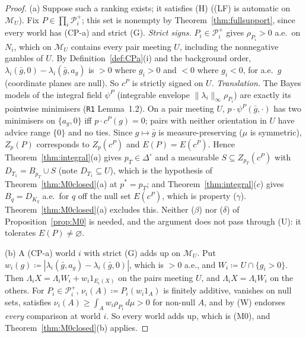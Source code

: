 \documentclass[11pt]{article}
\theoremstyle{definition}
\theoremstyle{remark}
\newcommand{\Di}{\Delta^{\circ}}
\newcommand{\M}{\mathcal M}
\newcommand{\src}[1]{\texttt{#1}}
\begin{document}
\begin{proof}
(a) Suppose such a ranking exists; it satisfies (H) ((LF) is automatic on $\M_U$). Fix $P\in\prod_i\mathcal P^+_i$; this set is nonempty by Theorem~\ref{thm:fullsupport}, since every world has (CP-a) and strict (G). \emph{Strict signs.} $P_i\in\mathcal P^+_i$ gives $\rho_{P_i}>0$ a.e.\ on $N_i$, which on $\M_U$ contains every pair meeting $U$, including the nonnegative gambles of $U$. By Definition~\ref{def:CPa}(i) and the background order, $\lambda_i(\bar g,0)-\lambda_i(\bar g,a_g)$ is $>0$ where $g_i>0$ and $<0$ where $g_i<0$, for a.e.\ $g$ (coordinate planes are null). So $c^P$ is strictly signed on $U$. \emph{Translation.} The Bayes models of the integral field $\psi^P$ (integrable envelope $\|\lambda_i\|_\infty\rho_{P_i}$) are exactly its pointwise minimisers (\src{R1} Lemma~1.2). On a pair meeting $U$, $p\cdot\psi^P(\bar g,\cdot)$ has two minimisers on $\{a_g,0\}$ iff $p\cdot c^P(g)=0$; pairs with neither orientation in $U$ have advice range $\{0\}$ and no ties. Since $g\mapsto\bar g$ is measure-preserving ($\mu$ is symmetric), $Z_p(P)$ corresponds to $Z_p(c^P)$ and $E(P)=E(c^P)$. Hence Theorem~\ref{thm:integral}($a$) gives $p_T\in\Di$ and a measurable $S\subseteq Z_{p_T}(c^P)$ with $D_{T_1}=B_{p_T}\cup S$ (note $D_{T_1}\subseteq U$), which is the hypothesis of Theorem~\ref{thm:M0closed}(a) at $p^*=p_T$; and Theorem~\ref{thm:integral}($c$) gives $B_q=D_{K_q}$ a.e.\ for $q$ off the null set $E(c^P)$, which is property ($\gamma$). Theorem~\ref{thm:M0closed}(a) excludes this. Neither ($\beta$) nor ($\delta$) of Proposition~\ref{prop:M0} is needed, and the argument does not pass through (U): it tolerates $E(P)\ne\varnothing$.

(b) A (CP-a) world $i$ with strict (G) adds up on $\M_U$. Put $w_i(g)\coloneqq|\lambda_i(\bar g,a_g)-\lambda_i(\bar g,0)|$, which is $>0$ a.e., and $W_i\coloneqq U\cap\{g_i>0\}$. Then $\Lambda_iX=\Lambda_iW_i+w_i1_{E_i(X)}$ on the pairs meeting $U$, and $\Lambda_iX=\Lambda_iW_i$ on the others. For $P_i\in\mathcal P^+_i$, $\nu_i(A)\coloneqq P_i(w_i1_A)$ is finitely additive, vanishes on null sets, satisfies $\nu_i(A)\ge\int_Aw_i\rho_{P_i}\,d\mu>0$ for non-null $A$, and by (W) endorses \emph{every} comparison at world $i$. So every world adds up, which is (M0), and Theorem~\ref{thm:M0closed}(b) applies.
\end{proof}
\end{document}
